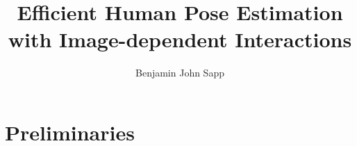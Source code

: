 \documentclass[12pt]{report}%
\theoremstyle{plain} \newtheorem{problem}{Problem}
\begin{document}

\newcommand{\mytitle}{Efficient Human Pose Estimation with Image-dependent 
Interactions}
\newcommand{\MYTITLE}{EFFICIENT HUMAN POSE ESTIMATION WITH IMAGE-DEPENDENT 
INTERACTIONS}

\title{\mytitle}
\author{Benjamin John Sapp}


  

 \beforepreface
\newpage
\copyrightpage
%
\newpage

\abstractp

% 

\tocstuff


\newpage
{}
\pagestyle{plain}


\part{Preliminaries}




%

%
%
%
%
%
%
%
%
%
%
%

\clearpage


\end{document}
